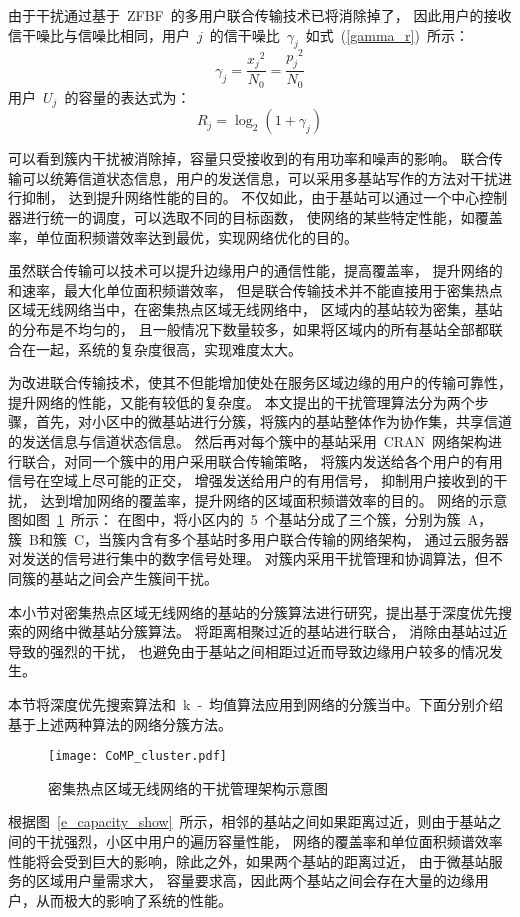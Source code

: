 由于干扰通过基于~ZFBF~的多用户联合传输技术已将消除掉了，
因此用户的接收信干噪比与信噪比相同，用户~$j$~的信干噪比~$\gamma_{j}$~如式~(\ref{gamma_r})~所示：
\begin{equation}\label{gamma_r}
  \gamma_j = \frac{{x_j}^2}{N_0}= \frac{{p_j}^2}{N_0}
\end{equation}
用户~$U_j$~的容量的表达式为：
\begin{equation}
  R_j = \log_2(1+\gamma_j)
\end{equation}

可以看到簇内干扰被消除掉，容量只受接收到的有用功率和噪声的影响。
联合传输可以统筹信道状态信息，用户的发送信息，可以采用多基站写作的方法对干扰进行抑制，
达到提升网络性能的目的。
不仅如此，由于基站可以通过一个中心控制器进行统一的调度，可以选取不同的目标函数，
使网络的某些特定性能，如覆盖率，单位面积频谱效率达到最优，实现网络优化的目的。

虽然联合传输可以技术可以提升边缘用户的通信性能，提高覆盖率，
提升网络的和速率，最大化单位面积频谱效率，
但是联合传输技术并不能直接用于密集热点区域无线网络当中，在密集热点区域无线网络中，
区域内的基站较为密集，基站的分布是不均匀的，
且一般情况下数量较多，如果将区域内的所有基站全部都联合在一起，系统的复杂度很高，实现难度太大。

为改进联合传输技术，使其不但能增加使处在服务区域边缘的用户的传输可靠性，提升网络的性能，又能有较低的复杂度。
本文提出的干扰管理算法分为两个步骤，首先，对小区中的微基站进行分簇，将簇内的基站整体作为协作集，共享信道的发送信息与信道状态信息。
然后再对每个簇中的基站采用~CRAN~网络架构进行联合，对同一个簇中的用户采用联合传输策略，
将簇内发送给各个用户的有用信号在空域上尽可能的正交，
增强发送给用户的有用信号，
抑制用户接收到的干扰，
达到增加网络的覆盖率，提升网络的区域面积频谱效率的目的。
网络的示意图如图~\ref{CoMP_cluster}~所示：
在图中，将小区内的~5~个基站分成了三个簇，分别为簇~A，簇~B和簇~C，当簇内含有多个基站时多用户联合传输的网络架构，
通过云服务器对发送的信号进行集中的数字信号处理。
对簇内采用干扰管理和协调算法，但不同簇的基站之间会产生簇间干扰。


本小节对密集热点区域无线网络的基站的分簇算法进行研究，提出基于深度优先搜索的网络中微基站分簇算法。
将距离相聚过近的基站进行联合，
消除由基站过近导致的强烈的干扰，
也避免由于基站之间相距过近而导致边缘用户较多的情况发生。

本节将深度优先搜索算法和~k~-~均值算法应用到网络的分簇当中。下面分别介绍基于上述两种算法的网络分簇方法。
\begin{figure}[htbp]
\centering
\texttt{[image: CoMP\_cluster.pdf]}
\caption{密集热点区域无线网络的干扰管理架构示意图}\vspace{-0.5em}
\label{CoMP_cluster}
\end{figure}
根据图~\ref{e_capacity_show}~所示，相邻的基站之间如果距离过近，则由于基站之间的干扰强烈，小区中用户的遍历容量性能，
网络的覆盖率和单位面积频谱效率性能将会受到巨大的影响，除此之外，如果两个基站的距离过近，
由于微基站服务的区域用户量需求大，
容量要求高，因此两个基站之间会存在大量的边缘用户，从而极大的影响了系统的性能。

